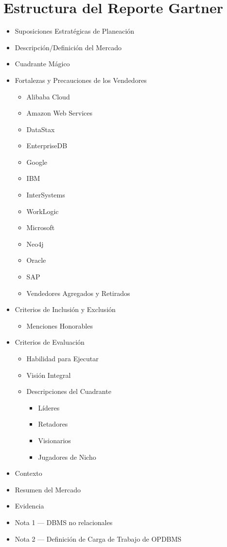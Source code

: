 \documentclass[11pt,letterpaper]{article}
\begin{document}
\section{Estructura del Reporte Gartner}
	\begin{itemize}
	\item Suposiciones Estratégicas de Planeación
	\item Descripción/Definición del Mercado
	\item Cuadrante Mágico
	\item Fortalezas y Precauciones de los Vendedores
		\begin{itemize}
		\item Alibaba Cloud
		\item Amazon Web Services
		\item DataStax
		\item EnterpriseDB
		\item Google
		\item IBM
		\item InterSystems
		\item WorkLogic
		\item Microsoft
		\item Neo4j
		\item Oracle
		\item SAP
		\item Vendedores Agregados y Retirados
		\end{itemize}
	\item Criterios de Inclusión y Exclusión
		\begin{itemize}
		\item Menciones Honorables
		\end{itemize}
	\item Criterios de Evaluación
		\begin{itemize}
		\item Habilidad para Ejecutar
		\item Visión Integral
		\item Descripciones del Cuadrante
		\begin{itemize}
			\item Líderes
			\item Retadores
			\item Visionarios
			\item Jugadores de Nicho
		\end{itemize}
		\end{itemize}
	\item Contexto
	\item Resumen del Mercado
	\item Evidencia
	\item Nota 1 --- DBMS no relacionales
	\item Nota 2 --- Definición de Carga de Trabajo de OPDBMS
	\end{itemize}
\end{document}

